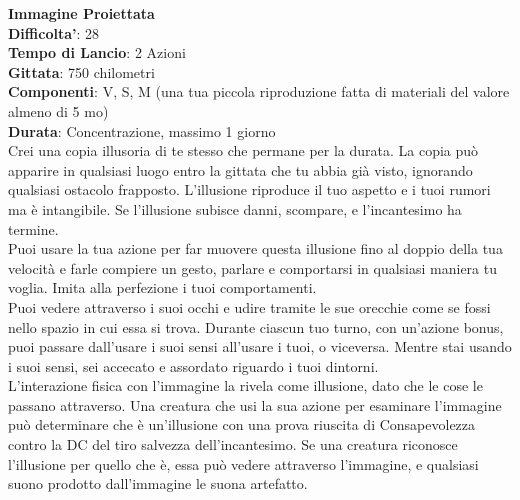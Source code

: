 \begin{multicols}{2}
\medskip\textbf{Immagine Proiettata}\\
\textbf{Difficolta'}: 28\\
\textbf{Tempo di Lancio}: 2 Azioni\\
\textbf{Gittata}: 750 chilometri\\
\textbf{Componenti}: V, S, M (una tua piccola riproduzione fatta di materiali del valore almeno di 5 mo)\\
\textbf{Durata}: Concentrazione, massimo 1 giorno\\
Crei una copia illusoria di te stesso che permane per la durata. La copia può apparire in qualsiasi luogo entro la gittata che tu abbia già visto, ignorando qualsiasi ostacolo frapposto. L’illusione riproduce il tuo aspetto e i tuoi rumori ma è intangibile. Se l’illusione subisce danni, scompare, e l’incantesimo ha termine.\\
Puoi usare la tua azione per far muovere questa illusione fino al doppio della tua velocità e farle compiere un gesto, parlare e comportarsi in qualsiasi maniera tu voglia. Imita alla perfezione i tuoi comportamenti.\\
Puoi vedere attraverso i suoi occhi e udire tramite le sue orecchie come se fossi nello spazio in cui essa si trova. Durante ciascun tuo turno, con un’azione bonus, puoi passare dall’usare i suoi sensi all’usare i tuoi, o viceversa. Mentre stai usando i suoi sensi, sei accecato e assordato riguardo i tuoi dintorni.\\
L’interazione fisica con l’immagine la rivela come illusione, dato che le cose le passano attraverso. Una creatura che usi la sua azione per esaminare l’immagine può determinare che è un’illusione con una prova riuscita di Consapevolezza contro la DC del tiro salvezza dell’incantesimo. Se una creatura riconosce l’illusione per quello che è, essa può vedere attraverso l’immagine, e qualsiasi suono prodotto dall’immagine le suona artefatto.


\end{multicols}
